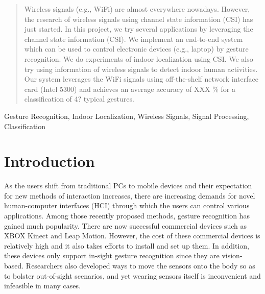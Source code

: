 \documentclass[conference]{IEEEtran}
\begin{document}
\begin{abstract}
Wireless signals (e.g., WiFi) are almost everywhere nowadays. However, the research of wireless signals using channel state information (CSI) has just started. In this project, we try several applications by leveraging the channel state information (CSI). We implement an end-to-end system which can be used to control electronic devices (e.g., laptop) by gesture recognition. We do experiments of indoor localization  using CSI. We also try using information of wireless signals to detect indoor human activities. Our system leverages the WiFi signals using off-the-shelf network interface card (Intel 5300) and achieves an average accuracy of XXX \% for a classification of 4? typical gestures.   

\end{abstract}


\begin{keywords}
Gesture Recognition, Indoor Localization, Wireless Signals, Signal Processing, Classification
\end{keywords}


%
\IEEEpeerreviewmaketitle

\section{Introduction}
As the users shift from traditional PCs to mobile devices and their expectation for new methods of interaction increases, there are increasing demands for novel human-computer interfaces (HCI) through which the users can control various applications.
Among those recently proposed methods, gesture recognition has gained much popularity. There are now successful commercial devices such as XBOX Kinect and Leap Motion. 
However, the cost of these commercial devices is relatively high and it also takes efforts to install and set up them.
In addition, these devices only support in-sight gesture recognition since they are vision-based.
Researchers also developed ways to move the sensors onto the body so as to bolster out-of-sight scenarios, and yet wearing sensors itself is inconvenient and infeasible in many cases.
\end{document}
